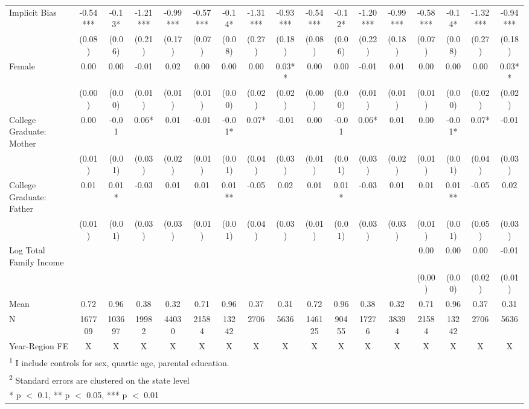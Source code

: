 \begin{table}[!h]
{\begin{tabular}[t]{lcccccccccccccccc}
\midrule
Implicit Bias & -0.54*** & -0.13* & -1.21*** & -0.99*** & -0.57*** & -0.14* & -1.31*** & -0.93*** & -0.54*** & -0.12* & -1.20*** & -0.99*** & -0.58*** & -0.14* & -1.32*** & -0.94***\\
 & (0.08) & (0.06) & (0.21) & (0.17) & (0.07) & (0.08) & (0.27) & (0.18) & (0.08) & (0.06) & (0.22) & (0.18) & (0.07) & (0.08) & (0.27) & (0.18)\\
Female & 0.00 & 0.00 & -0.01 & 0.02 & 0.00 & 0.00 & 0.00 & 0.03** & 0.00 & 0.00 & -0.01 & 0.01 & 0.00 & 0.00 & 0.00 & 0.03**\\
 & (0.00) & (0.00) & (0.01) & (0.01) & (0.01) & (0.00) & (0.02) & (0.02) & (0.00) & (0.00) & (0.01) & (0.01) & (0.01) & (0.00) & (0.02) & (0.02)\\
College Graduate: Mother & 0.00 & -0.01 & 0.06* & 0.01 & -0.01 & -0.01* & 0.07* & -0.01 & 0.00 & -0.01 & 0.06* & 0.01 & 0.00 & -0.01* & 0.07* & -0.01\\
 & (0.01) & (0.01) & (0.03) & (0.02) & (0.01) & (0.01) & (0.04) & (0.03) & (0.01) & (0.01) & (0.03) & (0.02) & (0.01) & (0.01) & (0.04) & (0.03)\\
College Graduate: Father & 0.01 & 0.01* & -0.03 & 0.01 & 0.01 & 0.01** & -0.05 & 0.02 & 0.01 & 0.01* & -0.03 & 0.01 & 0.01 & 0.01** & -0.05 & 0.02\\
 & (0.01) & (0.01) & (0.03) & (0.03) & (0.01) & (0.01) & (0.04) & (0.03) & (0.01) & (0.01) & (0.03) & (0.03) & (0.01) & (0.01) & (0.05) & (0.03)\\
Log Total Family Income &  &  &  &  &  &  &  &  &  &  &  &  & 0.00 & 0.00 & 0.00 & -0.01\\
 &  &  &  &  &  &  &  &  &  &  &  &  & (0.00) & (0.00) & (0.02) & (0.01)\\
\midrule
Mean & 0.72 & 0.96 & 0.38 & 0.32 & 0.71 & 0.96 & 0.37 & 0.31 & 0.72 & 0.96 & 0.38 & 0.32 & 0.71 & 0.96 & 0.37 & 0.31\\
N & 167709 & 103697 & 19982 & 44030 & 21584 & 13242 & 2706 & 5636 & 146125 & 90455 & 17276 & 38394 & 21584 & 13242 & 2706 & 5636\\
Year-Region FE & X & X & X & X & X & X & X & X & X & X & X & X & X & X & X & X\\
\bottomrule
\multicolumn{17}{l}{\rule{0pt}{1em}\textsuperscript{1} I include controls for sex, quartic age, parental education.}\\
\multicolumn{17}{l}{\rule{0pt}{1em}\textsuperscript{2} Standard errors are clustered on the state level}\\
\multicolumn{17}{l}{\rule{0pt}{1em}* p $<$ 0.1, ** p $<$ 0.05, *** p $<$ 0.01}\\
\end{tabular}}
\end{table}

